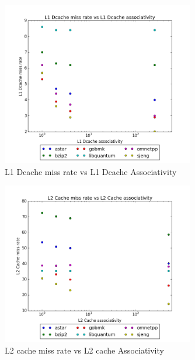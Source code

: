 \documentclass{article}
\begin{document}
\begin{figure}[ht]
    \centering
    \includegraphics[width=0.75\textwidth]{plots/L1Dcache_miss_vs_associativity.png}
    \caption{L1 Dcache miss rate vs L1 Dcache Associativity}
    \label{fig:l1missvsl1assoc}
\end{figure}

\begin{figure}[ht]
    \centering
    \includegraphics[width=0.75\textwidth]{plots/L2cache_miss_vs_L2cache_associativity.png}
    \caption{L2 cache miss rate vs L2 cache Associativity}
    \label{fig:l2missvsl2assoc}
\end{figure}
\end{document}
